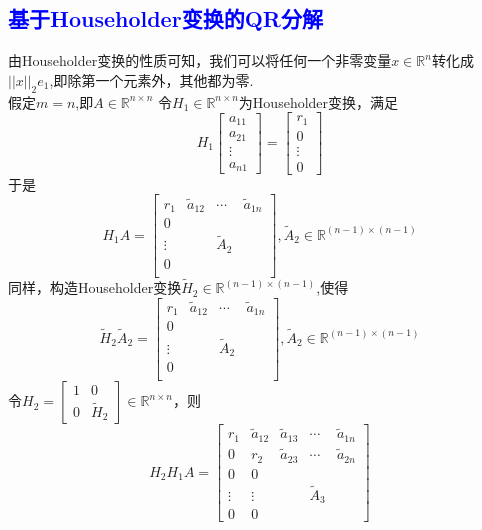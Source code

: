 \documentclass[12pt,a4paper]{article}
\begin{document}
\subsection{\textcolor{blue}{基于Householder变换的QR分解}}
由Householder变换的性质可知，我们可以将任何一个非零变量$x\in\mathbb{R}^{n}$转化成$||x||_{2}e_{1}$,即除第一个元素外，其他都为零.\\
假定$m=n$,即$A\in\mathbb{R}^{n\times n}$ 令$H_{1}\in\mathbb{R}^{n\times n}$为Householder变换，满足
$$
H_{1}\left[\begin{array}{c}{a_{11}} \\ {a_{21}} \\ {\vdots} \\ {a_{n 1}}\end{array}\right]=\left[\begin{array}{c}{r_{1}} \\ {0} \\ {\vdots} \\ {0}\end{array}\right]
$$
于是
$$
H_{1} A=\left[\begin{array}{c|ccc}
{r_{1}}&{\tilde{a}_{12}} &\cdots& {\tilde{a}_{1 n}} \\ \hline 
0& & & \\
\vdots&&{\tilde{A}_{2}}& \\
0& & &\\
\end{array}\right],\tilde{A}_{2} \in \mathbb{R}^{(n-1) \times(n-1)}
$$
同样，构造Householder变换$\tilde{H}_{2} \in \mathbb{R}^{(n-1) \times(n-1)}$,使得
$$
\tilde{H}_{2} \tilde{A}_{2}=\left[\begin{array}{c|ccc}
{r_{1}}&{\tilde{a}_{12}} &\cdots& {\tilde{a}_{1 n}} \\ \hline 
0& & & \\
\vdots&&{\tilde{A}_{2}}& \\
0& & &\\
\end{array}\right],\tilde{A}_{2} \in \mathbb{R}^{(n-1) \times(n-1)}
$$
令$H_{2}=\left[\begin{array}{cc}{1} & {0} \\ {0} & {\tilde{H}_{2}}\end{array}\right] \in \mathbb{R}^{n \times n}$，则
$$
H_{2} H_{1} A=
\left[\begin{array}{cc|ccc}
{r_{1}} & {\tilde{a}_{12}} & {\tilde{a}_{13}} & {\cdots} &{\tilde{a}_{1 n}} \\ 
{0} & {r_{2}} & {\tilde{a}_{23}}& {\cdots} & {\tilde{a}_{2 n}} \\ 
 \hline 
 0 & {0} &   &  &  \\
 \vdots&\vdots& &{\tilde{A}_{3}}  & \\
 {0} & {0} & {} & & \end{array}\right]
$$
\end{document}
